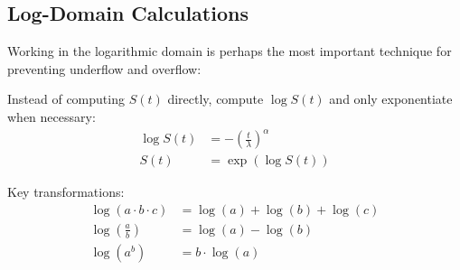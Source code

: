 \subsection{Log-Domain Calculations}

Working in the logarithmic domain is perhaps the most important technique for preventing underflow and overflow:

\begin{equationbox}[title=Log-Domain Transformations]
Instead of computing $S(t)$ directly, compute $\log S(t)$ and only exponentiate when necessary:
\begin{align}
    \log S(t) &= -\left(\frac{t}{\lambda}\right)^{\alpha} \\
    S(t) &= \exp\left(\log S(t)\right)
\end{align}

Key transformations:
\begin{align}
    \log(a \cdot b \cdot c) &= \log(a) + \log(b) + \log(c) \\
    \log\left(\frac{a}{b}\right) &= \log(a) - \log(b) \\
    \log(a^b) &= b \cdot \log(a)
\end{align}
\end{equationbox}

